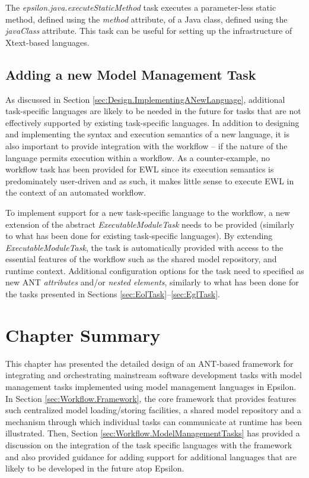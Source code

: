 The \emph{epsilon.java.executeStaticMethod} task executes a parameter-less static method, defined using the \emph{method} attribute, of a Java class, defined using the \emph{javaClass} attribute. This task can be useful for setting up the infrastructure of Xtext-based languages.

\subsection{Adding a new Model Management Task}
\label{sec:Workflow.NewModelManagementTask}

As discussed in Section \ref{sec:Design.ImplementingANewLanguage}, additional task-specific languages are likely to be needed in the future for tasks that are not effectively supported by existing task-specific languages. In addition to designing and implementing the syntax and execution semantics of a new language, it is also important to provide integration with the workflow -- if the nature of the language permits execution within a workflow. As a counter-example, no workflow task has been provided for EWL since its execution semantics is predominately user-driven and as such, it makes little sense to execute EWL in the context of an automated workflow.

To implement support for a new task-specific language to the workflow, a new extension of the abstract \emph{ExecutableModuleTask} needs to be provided (similarly to what has been done for existing task-specific languages). By extending \emph{ExecutableModuleTask}, the task is automatically provided with access to the essential features of the workflow such as the shared model repository, and runtime context. Additional configuration options for the task need to specified as new ANT \emph{attributes} and/or \emph{nested elements}, similarly to what has been done for the tasks presented in Sections \ref{sec:EolTask}--\ref{sec:EglTask}.

\section{Chapter Summary}

This chapter has presented the detailed design of an ANT-based framework for integrating and orchestrating mainstream software development tasks with model management tasks implemented using model management languages in Epsilon. In Section \ref{sec:Workflow.Framework}, the core framework that provides features such centralized model loading/storing facilities, a shared model repository and a mechanism through which individual tasks can communicate at runtime has been illustrated. Then, Section \ref{sec:Workflow.ModelManagementTasks} has provided a discussion on the integration of the task specific languages with the framework and also provided guidance for adding support for additional languages that are likely to be developed in the future atop Epsilon.